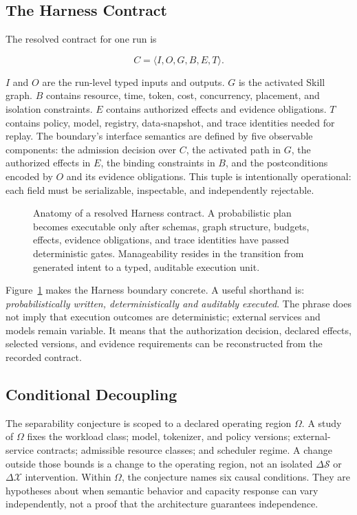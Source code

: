 \subsection{The Harness Contract}
\label{sec:harness-contract-def}

The resolved contract for one run is

\begin{equation}
C=\langle I,O,G,B,E,T\rangle.
\end{equation}

$I$ and $O$ are the run-level typed inputs and outputs. $G$ is the activated Skill graph. $B$ contains resource, time, token, cost, concurrency, placement, and isolation constraints. $E$ contains authorized effects and evidence obligations. $T$ contains policy, model, registry, data-snapshot, and trace identities needed for replay.
The boundary's interface semantics are defined by five observable components: the admission decision over $C$, the activated path in $G$, the authorized effects in $E$, the binding constraints in $B$, and the postconditions encoded by $O$ and its evidence obligations. This tuple is intentionally operational: each field must be serializable, inspectable, and independently rejectable.

\begin{figure}[t]
\centering
\caption{Anatomy of a resolved Harness contract. A probabilistic plan becomes executable only after schemas, graph structure, budgets, effects, evidence obligations, and trace identities have passed deterministic gates. Manageability resides in the transition from generated intent to a typed, auditable execution unit.}
\label{fig:harness-contract}
\end{figure}

Figure~\ref{fig:harness-contract} makes the Harness boundary concrete. A useful shorthand is: \textit{probabilistically written, deterministically and auditably executed}. The phrase does not imply that execution outcomes are deterministic; external services and models remain variable. It means that the authorization decision, declared effects, selected versions, and evidence requirements can be reconstructed from the recorded contract.

\subsection{Conditional Decoupling}
\label{sec:conditional-decoupling}

The separability conjecture is scoped to a declared operating region $\Omega$. A study of $\Omega$ fixes the workload class; model, tokenizer, and policy versions; external-service contracts; admissible resource classes; and scheduler regime. A change outside those bounds is a change to the operating region, not an isolated $\Delta\mathcal{S}$ or $\Delta\mathcal{X}$ intervention. Within $\Omega$, the conjecture names six causal conditions. They are hypotheses about when semantic behavior and capacity response can vary independently, not a proof that the architecture guarantees independence.

